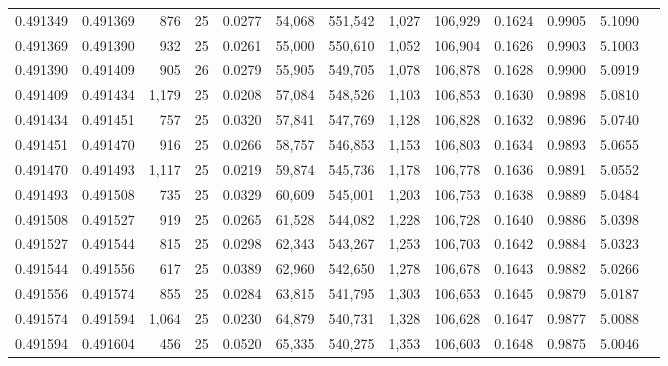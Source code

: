 \begin{tabular}{rrrrrrrrrrrrr}
0.491349 & 0.491369 &   876 &  25 &                                     0.0277 &  54,068 & 551,542 &   1,027 & 106,929 & 0.1624 & 0.9905 & 5.1090 \\
0.491369 & 0.491390 &   932 &  25 &                                     0.0261 &  55,000 & 550,610 &   1,052 & 106,904 & 0.1626 & 0.9903 & 5.1003 \\
0.491390 & 0.491409 &   905 &  26 &                                     0.0279 &  55,905 & 549,705 &   1,078 & 106,878 & 0.1628 & 0.9900 & 5.0919 \\
0.491409 & 0.491434 & 1,179 &  25 &                                     0.0208 &  57,084 & 548,526 &   1,103 & 106,853 & 0.1630 & 0.9898 & 5.0810 \\
0.491434 & 0.491451 &   757 &  25 &                                     0.0320 &  57,841 & 547,769 &   1,128 & 106,828 & 0.1632 & 0.9896 & 5.0740 \\
0.491451 & 0.491470 &   916 &  25 &                                     0.0266 &  58,757 & 546,853 &   1,153 & 106,803 & 0.1634 & 0.9893 & 5.0655 \\
0.491470 & 0.491493 & 1,117 &  25 &                                     0.0219 &  59,874 & 545,736 &   1,178 & 106,778 & 0.1636 & 0.9891 & 5.0552 \\
0.491493 & 0.491508 &   735 &  25 &                                     0.0329 &  60,609 & 545,001 &   1,203 & 106,753 & 0.1638 & 0.9889 & 5.0484 \\
0.491508 & 0.491527 &   919 &  25 &                                     0.0265 &  61,528 & 544,082 &   1,228 & 106,728 & 0.1640 & 0.9886 & 5.0398 \\
0.491527 & 0.491544 &   815 &  25 &                                     0.0298 &  62,343 & 543,267 &   1,253 & 106,703 & 0.1642 & 0.9884 & 5.0323 \\
0.491544 & 0.491556 &   617 &  25 &                                     0.0389 &  62,960 & 542,650 &   1,278 & 106,678 & 0.1643 & 0.9882 & 5.0266 \\
0.491556 & 0.491574 &   855 &  25 &                                     0.0284 &  63,815 & 541,795 &   1,303 & 106,653 & 0.1645 & 0.9879 & 5.0187 \\
0.491574 & 0.491594 & 1,064 &  25 &                                     0.0230 &  64,879 & 540,731 &   1,328 & 106,628 & 0.1647 & 0.9877 & 5.0088 \\
0.491594 & 0.491604 &   456 &  25 &                                     0.0520 &  65,335 & 540,275 &   1,353 & 106,603 & 0.1648 & 0.9875 & 5.0046 \\

\end{tabular}
